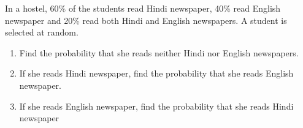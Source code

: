 \documentclass{article}
\begin{document}
In a hostel, 60\% of the students read Hindi newspaper, 40\% read English
newspaper and 20\% read both Hindi and English newspapers. A student is
selected at random.
\begin{enumerate}
  \item Find the probability that she reads neither Hindi nor English newspapers.
  \item If she reads Hindi newspaper, find the probability that she reads English newspaper.
  \item If she reads English newspaper, find the probability that she reads Hindi newspaper
\end{enumerate}
\end{document}
